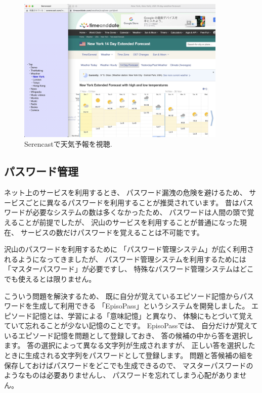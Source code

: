\documentclass[topics]{compsoft} %
\begin{document}
\begin{figure}[t]
  \includegraphics[width=10cm,bb=0 0 2510 1746]{figures/bb4027e2e210bc16450f0120a2987458.jpg}
  \caption{Serencastで天気予報を視聴.}
  \label{serencast}
\end{figure}

\subsection{パスワード管理}

ネット上のサービスを利用するとき、
パスワード漏洩の危険を避けるため、
サービスごとに異なるパスワードを利用することが推奨されています。
%
昔はパスワードが必要なシステムの数は多くなかったため、
パスワードは人間の頭で覚えることが前提でしたが、
沢山のサービスを利用することが普通になった現在、
サービスの数だけパスワードを覚えることは不可能です。

沢山のパスワードを利用するために
「パスワード管理システム」が広く利用されるようになってきましたが、
パスワード管理システムを利用するためには「マスターパスワード」が必要ですし、
特殊なパスワード管理システムはどこでも使えるとは限りません。

こういう問題を解決するため、
既に自分が覚えているエピソード記憶からパスワードを生成して利用できる
「EpisoPass」というシステムを開発しました\cite{episopass2}\cite{episopass1}。
エピソード記憶とは、学習による「意味記憶」と異なり、
体験にもとづいて覚えていて忘れることが少ない記憶のことです。
EpisoPassでは、
自分だけが覚えているエピソード記憶を問題として登録しておき、
答の候補の中から答を選択します。
答の選択によって異なる文字列が生成されますが、
正しい答を選択したときに生成される文字列をパスワードとして登録します。
問題と答候補の組を保存しておけばパスワードをどこでも生成できるので、
マスターパスワードのようなものは必要ありませんし、
パスワードを忘れてしまう心配がありません。
\end{document}
